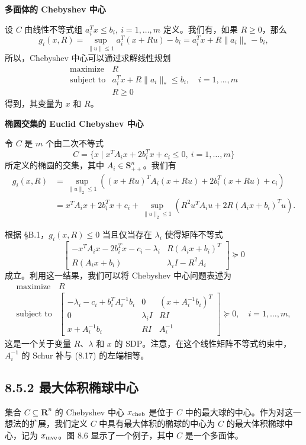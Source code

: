 \documentclass[UTF8,12pt,a4paper,fontset=fandol]{ctexart}
\begin{document}
\noindent\textbf{多面体的 Chebyshev 中心}

设 $C$ 由线性不等式组 $a_i^Tx\leq b_i,\ i=1,\ldots,m$ 定义。我们有，如果 $R\geq 0$，那么
\[
g_i(x,R)=\sup_{\|u\|\leq 1} a_i^T(x+Ru)-b_i
=a_i^Tx+R\|a_i\|_*-b_i,
\]
所以，Chebyshev 中心可以通过求解线性规划
\[
\begin{array}{ll}
\mbox{maximize} & R\\
\mbox{subject to} & a_i^Tx+R\|a_i\|_*\leq b_i,\quad i=1,\ldots,m\\
& R\geq 0
\end{array}
\]
得到，其变量为 $x$ 和 $R$。

\noindent\textbf{椭圆交集的 Euclid Chebyshev 中心}

令 $C$ 是 $m$ 个由二次不等式
\[
C=\{x\mid x^TA_ix+2b_i^Tx+c_i\leq 0,\ i=1,\ldots,m\}
\]
所定义的椭圆的交集，其中 $A_i\in\mathbf{S}_{++}^n$。我们有
\[
\begin{split}
g_i(x,R)
&=\sup_{\|u\|_2\leq 1}\left((x+Ru)^TA_i(x+Ru)+2b_i^T(x+Ru)+c_i\right)\\
&=x^TA_ix+2b_i^Tx+c_i
+\sup_{\|u\|_2\leq 1}\left(R^2u^TA_iu+2R(A_ix+b_i)^Tu\right).
\end{split}
\]

根据 \S B.1，$g_i(x,R)\leq 0$ 当且仅当存在 $\lambda_i$ 使得矩阵不等式
\[
\begin{bmatrix}
-x^TA_ix-2b_i^Tx-c_i-\lambda_i & R(A_ix+b_i)^T\\
R(A_ix+b_i) & \lambda_i I-R^2A_i
\end{bmatrix}\succeq 0
\tag{8.17}
\]
成立。利用这一结果，我们可以将 Chebyshev 中心问题表述为
\[
\begin{array}{ll}
\mbox{maximize} & R\\
\mbox{subject to} &
\begin{bmatrix}
-\lambda_i-c_i+b_i^TA_i^{-1}b_i & 0 & (x+A_i^{-1}b_i)^T\\
0 & \lambda_i I & RI\\
x+A_i^{-1}b_i & RI & A_i^{-1}
\end{bmatrix}\succeq 0,\quad i=1,\ldots,m,
\end{array}
\]
这是一个关于变量 $R$、$\lambda$ 和 $x$ 的 SDP。注意，在这个线性矩阵不等式约束中，$A_i^{-1}$ 的 Schur 补与 (8.17) 的左端相等。

\subsection*{8.5.2 最大体积椭球中心}

集合 $C\subseteq\mathbf{R}^n$ 的 Chebyshev 中心 $x_{\rm cheb}$ 是位于 $C$ 中的最大球的中心。作为对这一想法的扩展，我们定义 $C$ 中具有最大体积的椭球的中心为 $C$ 的最大体积椭球中心，记为 $x_{\rm mve}$。图 8.6 显示了一个例子，其中 $C$ 是一个多面体。
\end{document}
